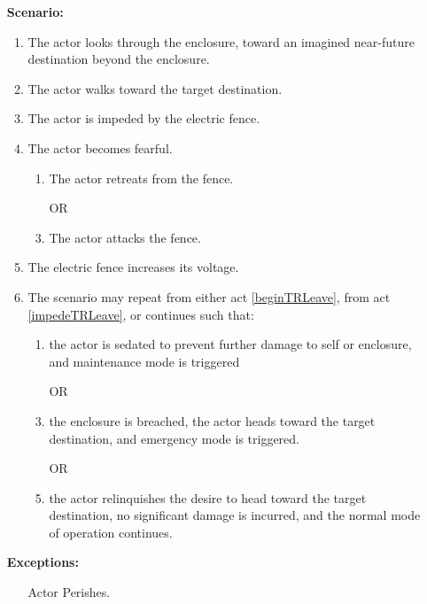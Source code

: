 \documentclass[12pt]{article}
\begin{document}
\begin{itemize}
        \item[]\textbf{Scenario:}                    
            \begin{enumerate}
                \item The actor looks through the enclosure, 
                toward an imagined near-future destination beyond
                the enclosure. \label{beginTRLeave}
                \item The actor walks toward the target destination.
                \item The actor is impeded by the electric fence. \label{impedeTRLeave}
                \item The actor becomes fearful.
                \begin{enumerate}
                    \item The actor retreats from the fence.
                    \item[OR]
                    \item The actor attacks the fence. 
                \end{enumerate}
                \item The electric fence increases its voltage.
                \item The scenario may repeat from either 
                act \ref{beginTRLeave}, from act \ref{impedeTRLeave}, 
                or continues such that:
                \begin{enumerate}
                    \item the actor is sedated to prevent further damage
                    to self or enclosure, and maintenance mode is triggered
                    \item[OR]
                    \item the enclosure is breached, the actor 
                    heads toward the target destination, and emergency
                    mode is triggered.
                    \item[OR]
                    \item the actor relinquishes the desire to head
                    toward the target destination, no significant damage
                    is incurred, and the normal mode of operation continues.
                \end{enumerate} 
            \end{enumerate}

        \item[]\textbf{Exceptions:}
            \begin{itemize}
                \item[] Actor Perishes.
            \end{itemize}


\end{itemize}
\end{document}
